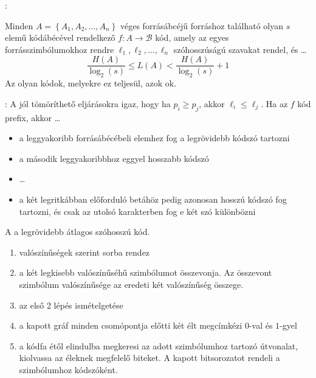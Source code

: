 \documentclass[main.tex]{subfiles}
\begin{document}
  {\large {}:}
  \vspace{.5em}
  
  Minden $A = \left\{ A_1, A_2, \dots , A_n \right\}$
  véges forrásábcéjű forráshoz található olyan $s$ elemű
  kódábécével rendelkező $f: A \rightarrow \mathcal{B}$
  kód, amely az egyes forrásszimbólumokhoz rendre
  $\ell_1, \ell_2, \dots, \ell_n$ szóhosszúságú szavakat
  rendel, és \dots
  \begin{equation*}
    \frac{H(A)}{\log_2(s)}
    \leq L(A)
    < \frac{H(A)}{\log_2(s)} + 1
  \end{equation*}
  Az olyan kódok, melyekre ez teljesül, azok ok.
  
  \pagebreak
  {\large {}:}
  \vspace{.5em}
  A jól tömöríthető eljárásokra igaz, hogy ha $p_i \geq p_j$,
  akkor $\ell_i \leq \ell_j$. Ha az $f$  kód prefix,
  akkor \dots
  \begin{itemize}
    \item a leggyakoribb forrásábécébeli elemhez
    fog a legrövidebb kódszó tartozni

    \item a második leggyakoribbhoz eggyel hosszabb kódszó
    
    \item \dots
    
    \item a két legritkábban előforduló betáhöz
    pedig azonosan hosszú kódszó fog tartozni,
    és csak az utolsó karakterben fog e két szó különbözni
  \end{itemize}


  A  a legrövidebb átlagos
  szóhosszú  kód.
  \begin{enumerate}
    \item valószínűségek szerint sorba rendez
    
    \item a két legkisebb valószínűséhű szimbólumot
    összevonja. Az összevont szimbólum valószínűsége
    az eredeti két valószínűség összege.

    \item az első 2 lépés ismételgetése
    
    \item a kapott gráf minden csomópontja előtti
    két élt megcímkézi $0$-val és $1$-gyel

    \item a kódfa étől elindulba megkeresi
    az adott szimbólumhoz tartozó útvonalat, kiolvassa
    az éleknek megfelelő biteket. A kapott bitsorozatot
    rendeli a szimbólumhoz kódszóként.
  \end{enumerate}
\end{document}
